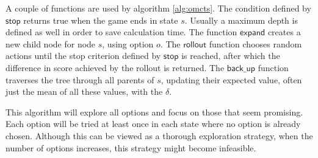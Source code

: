 A couple of functions are used by algorithm \ref{alg:omcts}. The condition defined by
$\mathsf{stop}$ returns true when the game ends in state $s$. Usually
a maximum depth is defined as well in order to save calculation time. The
function $\mathsf{expand}$ creates a new child node for node $s$, using option
$o$. The $\mathsf{rollout}$ function chooses random actions until the stop
criterion defined by $\mathsf{stop}$ is reached, after which the difference in
score achieved by the rollout is returned. The $\mathsf{back\_up}$ function
traverses the tree through all parents of $s$, updating their expected value,
 often just the mean of all these values,  with the $\delta$. 

This algorithm will explore all options and focus on those that seem promising.
Each option will be tried at least once in each state where no option is already
chosen. Although this can be viewed as a thorough exploration strategy, when the
number of options increases, this strategy might become infeasible.

